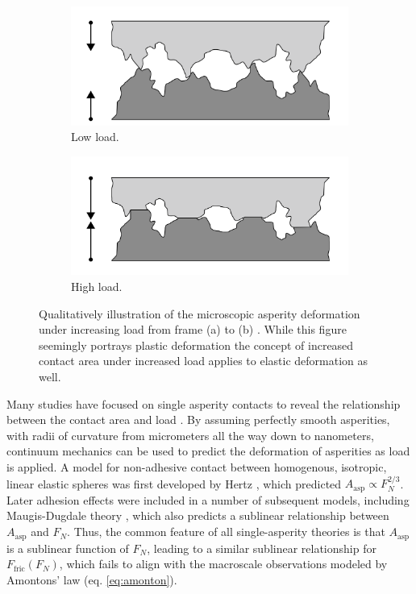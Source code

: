 \begin{figure}[H]
  \centering
  \begin{subfigure}[b]{0.49\textwidth}
      \centering
      \includegraphics[width=\textwidth]{figures/theory/asperities_top.png}
      \caption{Low load.}
      \label{fig:asp_left}
  \end{subfigure}
  \hfill
  \begin{subfigure}[b]{0.49\textwidth}
      \centering
      \includegraphics[width=\textwidth]{figures/theory/asperities_bottom.png}
      \caption{High load.}
      \label{fig:asp_right}
  \end{subfigure}
  \hfill
     \caption{Qualitatively illustration of the microscopic asperity deformation
     under increasing load from frame (a) to (b) \cite{wiki:asperities}. While this figure seemingly portrays plastic deformation the concept of increased contact area under increased load applies to elastic deformation as well.}
     \label{fig:asperity_contact}
\end{figure}

Many studies have focused on single asperity contacts to reveal the relationship
between the contact area and load
\cite{Szlufarska_2008, PhysRevLett.56.930, perry_scanning_2004}. By
assuming perfectly smooth asperities, with radii of curvature from micrometers
all the way down to nanometers, continuum mechanics can be used to predict the
deformation of asperities as load is applied. A model for non-adhesive contact
between homogenous, isotropic, linear elastic spheres was first developed by
Hertz \cite{HertzOnTC}, which predicted $A_{\text{asp}} \propto F_N^{2/3}$.
Later adhesion effects were included in a number of subsequent models, including
Maugis-Dugdale theory \cite{MAUGIS1992243}, which also predicts a sublinear
relationship between $A_{\text{asp}}$ and $F_N$. Thus, the common feature of all
single-asperity theories is that $A_{\text{asp}}$ is a sublinear function of
$F_N$, leading to a similar sublinear relationship for $F_\text{fric}(F_N)$,
which fails to align with the macroscale observations modeled by Amontons’ law
(eq. \eqref{eq:amonton}).

